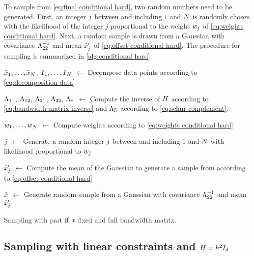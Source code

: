 To sample from \cref{eq:final conditional hard}, two random numbers need to be generated. 
First, an integer $j$ between and including $1$ and $N$ is randomly chosen with the likelihood of the integer $j$ proportional to the weight $w_{j}$ of \cref{eq:weights conditional hard}. 
Next, a random sample is drawn from a Gaussian with covariance $\Lambda_{22}^{-1}$ and mean $\hat{x}_{j}'$ of \cref{eq:offset conditional hard}.
The procedure for sampling is summarized in \cref{alg:conditional hard}.


\begin{algorithm}[t]
	
	$\bar{x}_{1},\ldots,\bar{x}_{N}$, $\hat{x}_{1},\ldots,\hat{x}_{N}$ $\gets$ Decompose data points according to \cref{eq:decomposition data}
	
	$\Lambda_{11}$, $\Lambda_{12}$, $\Lambda_{21}$, $\Lambda_{22}$, $\Lambda_{\mathrm{S}}$ $\gets$ Compute the inverse of $H$ according to \cref{eq:bandwidth matrix inverse} and $\Lambda_{\mathrm{S}}$ according to \cref{eq:schur complement}.
	
	$w_{1},\ldots,w_{N}$ $\gets$ Compute weights according to \cref{eq:weights conditional hard}
	
	$j$ $\gets$ Generate a random integer $j$ between and including $1$ and $N$ with likelihood proportional to $w_{j}$
	
	$\hat{x}_{j}'$ $\gets$ Compute the mean of the Gaussian to generate a sample from according to \cref{eq:offset conditional hard}
	
	$\hat{x}$ $\gets$ Generate random sample from a Gaussian with covariance $\Lambda_{22}^{-1}$ and mean $\hat{x}_{j}'$
		
	\caption{Sampling with part if $x$ fixed and full bandwidth matrix.}
	\label{alg:conditional hard}
\end{algorithm}



\subsection{Sampling with linear constraints and $H=h^2I_{d}$}
\label{sec:sampling constrained simple}

